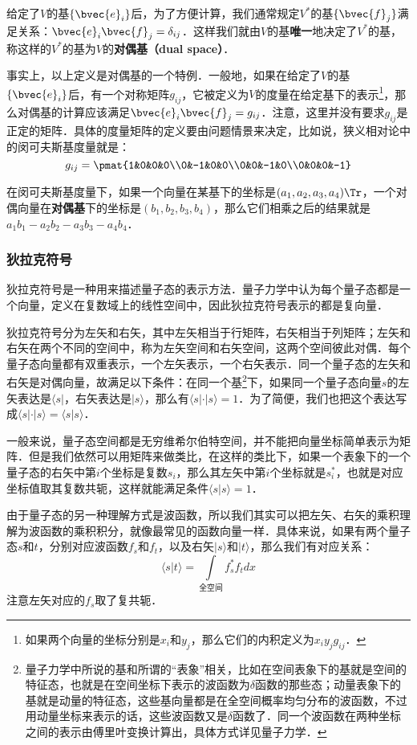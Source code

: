 给定了$V$的基$\{\bvec{e}_i\}$后，为了方便计算，我们通常规定$V^*$的基$\{\bvec{f}_j\}$满足关系：$\bvec{e}_i\bvec{f}_j=\delta_{ij}$．这样我们就由$V$的基\textbf{唯一}地决定了$V^*$的基，称这样的$V^*$的基为$V$的\textbf{对偶基（dual space）}．

事实上，以上定义是对偶基的一个特例．一般地，如果在给定了$V$的基$\{\bvec{e}_i\}$后，有一个对称矩阵$g_{ij}$，它被定义为$V$的度量在给定基下的表示\footnote{如果两个向量的坐标分别是$x_i$和$y_j$，那么它们的内积定义为$x_iy_jg_{ij}$．}，那么对偶基的计算应该满足$\bvec{e}_i\bvec{f}_j=g_{ij}$．注意，这里并没有要求$g_{ij}$是正定的矩阵．具体的度量矩阵的定义要由问题情景来决定，比如说，狭义相对论中的闵可夫斯基度量就是：
\begin{equation}
g_{ij}=\pmat{1&0&0&0\\0&-1&0&0\\0&0&-1&0\\0&0&0&-1}
\end{equation}

在闵可夫斯基度量下，如果一个向量在某基下的坐标是$(a_1, a_2, a_3, a_4)\Tr$，一个对偶向量在\textbf{对偶基}下的坐标是$(b_1, b_2, b_3, b_4)$，那么它们相乘之后的结果就是$a_1b_1-a_2b_2-a_3b_3-a_4b_4$．



\subsubsection{狄拉克符号}

狄拉克符号是一种用来描述量子态的表示方法．量子力学中认为每个量子态都是一个向量，定义在复数域上的线性空间中，因此狄拉克符号表示的都是复向量．

狄拉克符号分为左矢和右矢，其中左矢相当于行矩阵，右矢相当于列矩阵；左矢和右矢在两个不同的空间中，称为左矢空间和右矢空间，这两个空间彼此对偶．每个量子态向量都有双重表示，一个左矢表示，一个右矢表示．同一个量子态的左矢和右矢是对偶向量，故满足以下条件：在同一个基\footnote{量子力学中所说的基和所谓的“表象”相关，比如在空间表象下的基就是空间的特征态，也就是在空间坐标下表示的波函数为$\delta$函数的那些态；动量表象下的基就是动量的特征态，这些基向量都是在全空间概率均匀分布的波函数，不过用动量坐标来表示的话，这些波函数又是$\delta$函数了．同一个波函数在两种坐标之间的表示由傅里叶变换计算出，具体方式详见量子力学．}下，如果同一个量子态向量$s$的左矢表达是$\langle s|$，右矢表达是$|s\rangle$，那么有$\langle s|\cdot|s\rangle=1$．为了简便，我们也把这个表达写成$\langle s|\cdot|s\rangle=\langle s|s\rangle$．

一般来说，量子态空间都是无穷维希尔伯特空间，并不能把向量坐标简单表示为矩阵．但是我们依然可以用矩阵来做类比，在这样的类比下，如果一个表象下的一个量子态的右矢中第$i$个坐标是复数$s_i$，那么其左矢中第$i$个坐标就是$s_i^*$，也就是对应坐标值取其复数共轭，这样就能满足条件$\langle s|s\rangle=1$．

由于量子态的另一种理解方式是波函数，所以我们其实可以把左矢、右矢的乘积理解为波函数的乘积积分，就像最常见的函数向量一样．具体来说，如果有两个量子态$s$和$t$，分别对应波函数$f_s$和$f_t$，以及右矢$|s\rangle$和$|t\rangle$，那么我们有对应关系：
\begin{equation}\langle s|t\rangle=\int\limits_{\text{全空间}}f_s^*f_tdx\end{equation}
注意左矢对应的$f_s$取了复共轭．









